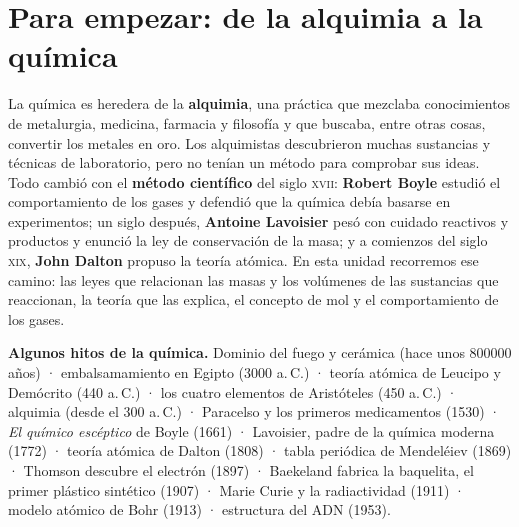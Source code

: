 
\section*{Para empezar: de la alquimia a la química}

La química es heredera de la \textbf{alquimia}, una práctica que mezclaba conocimientos de metalurgia, medicina, farmacia
y filosofía y que buscaba, entre otras cosas, convertir los metales en oro. Los alquimistas descubrieron muchas sustancias y
técnicas de laboratorio, pero no tenían un método para comprobar sus ideas. Todo cambió con el \textbf{método científico}
del siglo \textsc{xvii}: \textbf{Robert Boyle} estudió el comportamiento de los gases y defendió que la química debía basarse en
experimentos; un siglo después, \textbf{Antoine Lavoisier} pesó con cuidado reactivos y productos y enunció la ley de
conservación de la masa; y a comienzos del siglo \textsc{xix}, \textbf{John Dalton} propuso la teoría atómica. En esta unidad
recorremos ese camino: las leyes que relacionan las masas y los volúmenes de las sustancias que reaccionan, la teoría que las
explica, el concepto de mol y el comportamiento de los gases.

\begin{remark}
    \textbf{Algunos hitos de la química.} Dominio del fuego y cerámica (hace unos \num{800000} años) ·
    embalsamamiento en Egipto (\num{3000} a.\,C.) · teoría atómica de Leucipo y Demócrito (440 a.\,C.) ·
    los cuatro elementos de Aristóteles (450 a.\,C.) · alquimia (desde el 300 a.\,C.) ·
    Paracelso y los primeros medicamentos (1530) · \emph{El químico escéptico} de Boyle (1661) ·
    Lavoisier, padre de la química moderna (1772) · teoría atómica de Dalton (1808) ·
    tabla periódica de Mendeléiev (1869) · Thomson descubre el electrón (1897) ·
    Baekeland fabrica la baquelita, el primer plástico sintético (1907) · Marie Curie y la radiactividad (1911) ·
    modelo atómico de Bohr (1913) · estructura del ADN (1953).
\end{remark}

